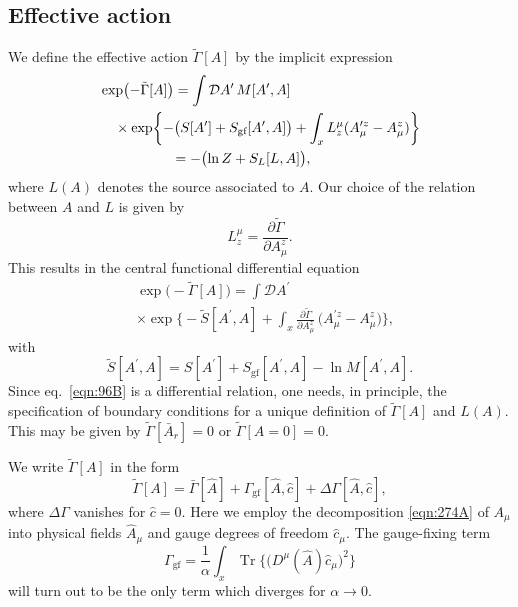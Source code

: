 \documentclass[twocolumn,aps,prd,amsmath,amssymb,preprintnumbers,longbibliography]{revtex4-1}
\numberwithin{equation}{section}
\newcounter{condition}[equation]
\DeclareMathOperator{\Tr}{Tr}
\newenvironment{alignedeqn}{\begin{equation}\begin{aligned}}{\end{aligned}\end{equation}\ignorespacesafterend}
\begin{document}
\subsection{Effective action}

We define the effective action $\tilde\Gamma[A]$ by the implicit expression
\begin{align}\label{eqn:346A}
	&\exp\bigl(-\tilde\Gamma[A]\bigr)
	= \int \mathcal{D} A^\prime \, M[A^\prime,A]\\
	&\hphantom{{}=}\times\exp \biggl\{-\bigl(S[A^\prime] + S_\text{gf}[A^\prime,A]\bigr) + \int_xL^\mu_z(A^{\prime z}_\mu - A^z_\mu)\biggr\}\notag\\
	&\hphantom{\exp\bigl(-\tilde\Gamma[A]\bigr)}= -\bigl(\ln Z + S_L[L,A]\bigr),\notag
\end{align}
where $L(A)$ denotes the source associated to $A$. Our choice of the relation between $A$ and $L$ is given by
\begin{equation}\label{eqn:96A}
	L_z^\mu
	= \frac{\partial \tilde\Gamma}{\partial A_\mu^z}.
\end{equation}
This results in the central functional differential equation
\begin{alignedeqn}\label{eqn:96B}
	&\exp\bigl(-\tilde\Gamma[A]\bigr)
	= \int \mathcal{D} A^\prime\\
	&\times \exp\biggl\{-\tilde{S}[A^\prime,A] + \int_x \frac{\partial \tilde\Gamma}{\partial A_\mu^z} \, \bigl(A_\mu^{\prime z} - A_\mu^z\bigr)\biggr\},
\end{alignedeqn}
with
\begin{equation}\label{eqn:96C}
	\tilde{S}[A^\prime,A]
	= S[A^\prime] + S_\text{gf}[A^\prime,A] - \ln M[A^\prime,A].
\end{equation}
Since eq.~\eqref{eqn:96B} is a differential relation, one needs, in principle, the specification of boundary conditions for a unique definition of $\tilde\Gamma[A]$ and $L(A)$. This may be given by $\tilde\Gamma[\bar{A}_r] = 0$ or $\tilde\Gamma[A = 0] = 0$.

We write $\tilde\Gamma[A]$ in the form
\begin{equation}\label{eqn:347A}
	\tilde\Gamma[A]
	= \bar{\Gamma}[\hat{A}] + \Gamma_\text{gf} [\hat{A},\hat{c}] + \Delta\Gamma [\hat{A},\hat{c}],
\end{equation}
where $\Delta\Gamma$ vanishes for $\hat{c} = 0$. Here we employ the decomposition \eqref{eqn:274A} of $A_{\mu}$ into physical fields $\hat{A}_\mu$ and gauge degrees of freedom $\hat{c}_\mu$. The gauge-fixing term
\begin{equation}\label{eqn:307G}
	\Gamma_\text{gf}
	= \frac{1}{\alpha} \int_x \Tr\bigl\{\bigl(D^\mu(\hat{A})\hat{c}_\mu\bigr)^2\bigr\}
\end{equation}
will turn out to be the only term which diverges for $\alpha \to 0$.
\end{document}
